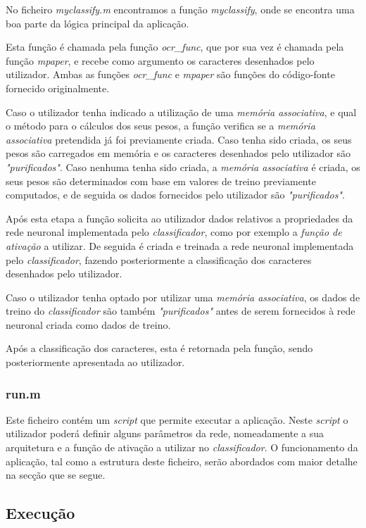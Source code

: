 \documentclass{article}
\begin{document}
No ficheiro \emph{myclassify.m} encontramos a função \emph{myclassify}, onde se encontra uma boa parte da lógica principal da aplicação.

Esta função é chamada pela função \emph{ocr\_func}, que por sua vez é chamada pela função \emph{mpaper}, e recebe como argumento os caracteres desenhados pelo utilizador. Ambas as funções \emph{ocr\_func} e \emph{mpaper} são funções do código-fonte fornecido originalmente.

Caso o utilizador tenha indicado a utilização de uma \emph{memória associativa}, e qual o método para o cálculos dos seus pesos, a função verifica se a \emph{memória associativa} pretendida já foi previamente criada. Caso tenha sido criada, os seus pesos são carregados em memória e os caracteres desenhados pelo utilizador são \emph{"purificados"}. Caso nenhuma tenha sido criada, a \emph{memória associativa} é criada, os seus pesos são determinados com base em valores de treino previamente computados, e de seguida os dados fornecidos pelo utilizador são \emph{"purificados"}.

Após esta etapa a função solicita ao utilizador dados relativos a propriedades da rede neuronal implementada pelo \emph{classificador}, como por exemplo a \emph{função de ativação} a utilizar. De seguida é criada e treinada a rede neuronal implementada pelo \emph{classificador}, fazendo posteriormente a classificação dos caracteres desenhados pelo utilizador.

Caso o utilizador tenha optado por utilizar uma \emph{memória associativa}, os dados de treino do \emph{classificador} são também \emph{"purificados"} antes de serem fornecidos à rede neuronal criada como dados de treino.

Após a classificação dos caracteres, esta é retornada pela função, sendo posteriormente apresentada ao utilizador.

\subsubsection{run.m}

Este ficheiro contém um \emph{script} que permite executar a aplicação. Neste \emph{script} o utilizador poderá definir alguns parâmetros da rede, nomeadamente a sua arquitetura e a função de ativação a utilizar no \emph{classificador}. O funcionamento da aplicação, tal como a estrutura deste ficheiro, serão abordados com maior detalhe na secção que se segue.

\subsection{Execução}
\end{document}
